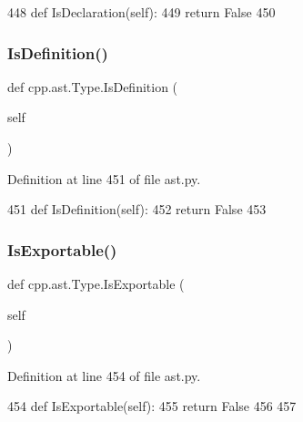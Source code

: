 \begin{DoxyCode}
448     \textcolor{keyword}{def }IsDeclaration(self):
449         \textcolor{keywordflow}{return} \textcolor{keyword}{False}
450 
\end{DoxyCode}
\mbox{\label{classcpp_1_1ast_1_1Type_aedff25dc3736e83388742e55fe29159b}} 
\subsubsection{\texorpdfstring{Is\+Definition()}{IsDefinition()}}
{\footnotesize\ttfamily def cpp.\+ast.\+Type.\+Is\+Definition (\begin{DoxyParamCaption}\item[{}]{self }\end{DoxyParamCaption})}



Definition at line 451 of file ast.\+py.


\begin{DoxyCode}
451     \textcolor{keyword}{def }IsDefinition(self):
452         \textcolor{keywordflow}{return} \textcolor{keyword}{False}
453 
\end{DoxyCode}
\mbox{\label{classcpp_1_1ast_1_1Type_a80dce781581c03e550ce51a9a33ca158}} 
\subsubsection{\texorpdfstring{Is\+Exportable()}{IsExportable()}}
{\footnotesize\ttfamily def cpp.\+ast.\+Type.\+Is\+Exportable (\begin{DoxyParamCaption}\item[{}]{self }\end{DoxyParamCaption})}



Definition at line 454 of file ast.\+py.


\begin{DoxyCode}
454     \textcolor{keyword}{def }IsExportable(self):
455         \textcolor{keywordflow}{return} \textcolor{keyword}{False}
456 
457 
\end{DoxyCode}


